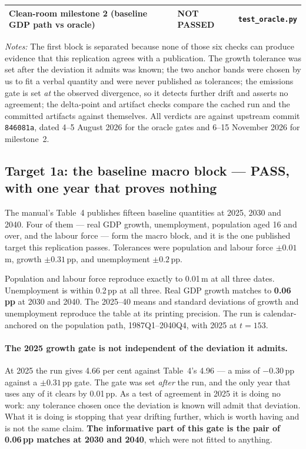 \begin{table}[t]
\begin{tabularx}{\textwidth}{@{}>{\raggedright\arraybackslash}Xll@{}}
Clean-room milestone 2 (baseline GDP path vs oracle) & \textbf{NOT PASSED} & \texttt{test\_oracle.py} \\
\bottomrule
\end{tabularx}
\par\smallskip
\parbox{0.97\textwidth}{\footnotesize \emph{Notes:} The first block is separated because none of those six checks can produce evidence that this replication agrees with a publication. The growth tolerance was set after the deviation it admits was known; the two anchor bands were chosen by us to fit a verbal quantity and were never published as tolerances; the emissions gate is set \emph{at} the observed divergence, so it detects further drift and asserts no agreement; the delta-point and artifact checks compare the cached run and the committed artifacts against themselves. All verdicts are against upstream commit \texttt{846081a}, dated 4--5 August 2026 for the oracle gates and 6--15 November 2026 for milestone~2.}
\end{table}

\subsection{Target 1a: the baseline macro block --- PASS, with one year that proves nothing}
\label{sec:target1a}

The manual's Table~4 publishes fifteen baseline quantities at 2025, 2030 and 2040. Four of them --- real GDP growth, unemployment, population aged 16 and over, and the labour force --- form the macro block, and it is the one published target this replication passes. Tolerances were population and labour force $\pm0.01$\,m, growth $\pm0.31$\,pp, and unemployment $\pm0.2$\,pp.

Population and labour force reproduce exactly to 0.01\,m at all three dates. Unemployment is within 0.2\,pp at all three. Real GDP growth matches to \textbf{0.06\,pp} at 2030 and 2040. The 2025--40 means and standard deviations of growth and unemployment reproduce the table at its printing precision. The run is calendar-anchored on the population path, 1987Q1--2040Q4, with 2025 at $t=153$.

\paragraph{The 2025 growth gate is not independent of the deviation it admits.} At 2025 the run gives 4.66 per cent against Table~4's 4.96 --- a miss of $-0.30$\,pp against a $\pm0.31$\,pp gate. The gate was set \emph{after} the run, and the only year that uses any of it clears by 0.01\,pp. As a test of agreement in 2025 it is doing no work: any tolerance chosen once the deviation is known will admit that deviation. What it is doing is stopping that year drifting further, which is worth having and is not the same claim. \textbf{The informative part of this gate is the pair of 0.06\,pp matches at 2030 and 2040}, which were not fitted to anything.

